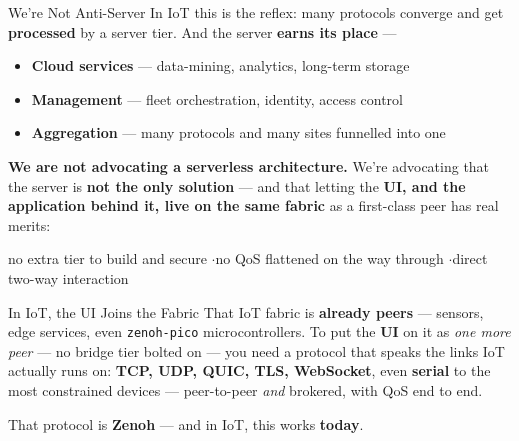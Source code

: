\documentclass[9pt]{beamer}
\begin{document}
\begin{frame}{We're Not Anti-Server}
  In IoT this is the reflex: many protocols converge and get \textbf{processed} by a server tier. And the server \textbf{earns its place} ---

  \vspace{0.3em}
  \begin{itemize}
    \item \textbf{Cloud services} --- data-mining, analytics, long-term storage
    \item \textbf{Management} --- fleet orchestration, identity, access control
    \item \textbf{Aggregation} --- many protocols and many sites funnelled into one
  \end{itemize}

  \vspace{0.5em}
  \textbf{We are not advocating a serverless architecture.} We're advocating that the server is \textbf{not the only solution} --- and that letting the \textbf{UI, and the application behind it, live on the same fabric} as a first-class peer has real merits:

  \vspace{0.4em}
  \begin{center}
    {\small no extra tier to build and secure \quad$\cdot$\quad no QoS flattened on the way through \quad$\cdot$\quad direct two-way interaction}
  \end{center}
\end{frame}

\begin{frame}{In IoT, the UI Joins the Fabric}
  That IoT fabric is \textbf{already peers} --- sensors, edge services, even \texttt{zenoh-pico} microcontrollers. To put the \textbf{UI} on it as \emph{one more peer} --- no bridge tier bolted on --- you need a protocol that speaks the links IoT actually runs on: \textbf{TCP, UDP, QUIC, TLS, WebSocket}, even \textbf{serial} to the most constrained devices --- \mbox{peer-to-peer} \emph{and} brokered, with QoS end to end.

  \vspace{0.7em}
  \begin{center}
    {\Large That protocol is \textbf{Zenoh} --- and in IoT, this works \textbf{today}.}
  \end{center}
\end{frame}
\end{document}
